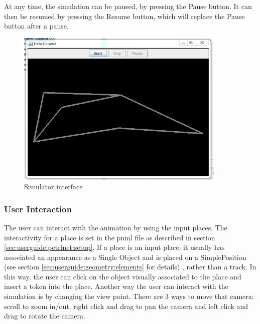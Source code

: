 At any time, the simulation can be paused, by pressing the Pause button. It can then be resumed by pressing the Resume button, which will
replace the Pause button after a pause.

\begin{figure}[htp]
\begin{center}
  \includegraphics[width=10.0cm]{image/simulator.png}
  \caption{Simulator interface}
  \label{fig:simulator}
\end{center}
\end{figure}

\subsubsection{User Interaction}
The user can interact with the animation by using the input places. The interactivity for a place is set in the 
pnml file as described in section \ref{sec:userguide:petrinet:setup}. If a place is an input place, it usually has associated
an appearance as a Single Object and is placed on a SimplePosition (see section \ref{sec:userguide:geometry:elements} for details) , rather than a track. 
In this way, the user can click on the object visually associated to the place and insert a token into the place.
Another way the user can interact with the simulation is by changing the view point. There are 3 ways to move that camera: scroll to zoom in/out,
right click and drag to pan the camera and left click and drag to rotate the camera.



